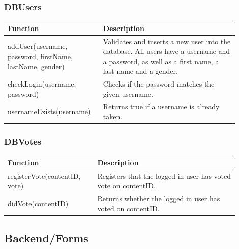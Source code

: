 \subsubsection{DBUsers}
\begin{minipage}{\linewidth}
  \centering
  \setlength{\tabcolsep}{12pt}
  \begin{tabular}{|p{0.35\linewidth}|p{0.55\linewidth}|}
  \hline
  \cellcolor{gray!25} Function & \cellcolor{gray!25} Description \\
  \hline
  addUser(username, password, firstName, lastName, gender) & Validates and inserts a new user into the database. All users have a username and a password, as well as a first name, a last name and a gender. \\
  checkLogin(username, password) & Checks if the password matches the given username. \\
  usernameExists(username) & Returns true if a username is already taken. \\
  \hline  
  \end{tabular}
\end{minipage}

\subsubsection{DBVotes}
\begin{minipage}{\linewidth}
  \centering
  \setlength{\tabcolsep}{12pt}
  \begin{tabular}{|p{0.35\linewidth}|p{0.55\linewidth}|}
  \hline
  \cellcolor{gray!25} Function & \cellcolor{gray!25} Description \\
  \hline
  registerVote(contentID, vote) & Registers that the logged in user has voted vote on contentID. \\
  didVote(contentID) & Returns whether the logged in user has voted on contentID. \\
  \hline  
  \end{tabular}
\end{minipage}

\subsection{Backend/Forms}
\label{subsec:CodeDetailsBackendForms}

